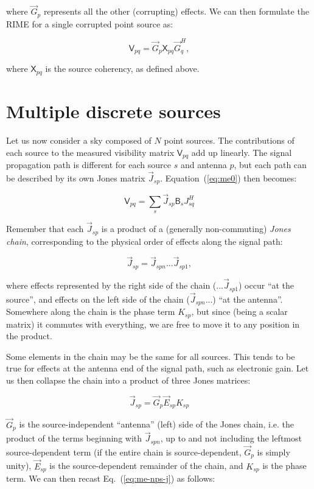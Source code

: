 \documentclass{aa}
\newcommand{\herm}{H}
\newcommand{\jones}[2]{\vec {#1}_{#2}}
\newcommand{\jonesT}[2]{\vec {#1}^{\herm}_{#2}}
\newcommand{\coh}[2]{\mathsf{{#1}}_{{#2}}}
\begin{document}
where $\jones{G}{p}$ represents all the other (corrupting) effects. We can then formulate the RIME for a single corrupted point source as:

  \begin{equation}\label{eq:me-point-source-corrupted}
  \coh{V}{pq} = \jones{G}{p} \coh{X}{pq} \jonesT{G}{q},
  \end{equation}

where $\coh{X}{pq}$ is the source coherency, as defined above.
 

\section{Multiple discrete sources\label{sec:me-multiple-sources}}

Let us now consider a sky composed of $N$ point sources. The contributions of each source to the measured visibility matrix $\coh{V}{pq}$ add up linearly. The signal propagation path is different for each source $s$ and antenna $p$, but each path can be described by its own Jones matrix $\jones{J}{sp}$. Equation~(\ref{eq:me0}) then becomes:

  \begin{equation}\label{eq:me-nps-j}
  \coh{V}{pq} = \sum_{s}{\jones{J}{sp} \coh{B}{s} J^\herm_{sq}}
  \end{equation}

Remember that each $\jones{J}{sp}$ is a product of a (generally non-commuting) {\em Jones chain}, corresponding to the physical order of effects along the signal path:

  \[
  \jones{J}{sp} = \jones{J}{spn} ... \jones{J}{sp1},
  \]

where effects represented by the right side of the chain ($...\jones{J}{sp1}$) occur ``at the source'', and effects on the left side of the chain ($\jones{J}{spn}...$) ``at the antenna''. Somewhere along the chain is the phase term $K_{sp}$, but since (being a scalar matrix) it commutes with everything, we are free to move it to any position in the product.

Some elements in the chain may be the same for all sources. This tends to be true for effects at the antenna end of the signal path, such as electronic gain. Let us then collapse the chain into a product of three Jones matrices:

  \[
  \jones{J}{sp} = \jones{G}{p} \jones{E}{sp} K_{sp}
  \]

$\jones{G}{p}$ is the source-independent ``antenna'' (left) side of the Jones chain, i.e. the product of the terms beginning with $\jones{J}{spn}$, up to and not including the leftmost source-dependent term (if the entire chain is source-dependent, $\jones{G}{p}$ is simply unity), $\jones{E}{sp}$ is the source-dependent remainder of the chain, and $K_{sp}$ is the phase term. We can then recast Eq.~(\ref{eq:me-nps-j}) as follows:
\end{document}
